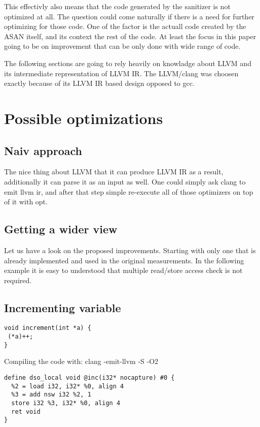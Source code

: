 \documentclass[letterpaper, 10 pt, conference]{llncs}  %
\let\cite\parencite
\begin{document}
This effectivly also means that the code generated by the sanitizer is not optimized at all. The question could come naturally if there is a need for further optimizing for those code. One of the factor is the actuall code created by the ASAN itself, and its context the rest of the code. At least the focus in this paper going to be on improvement that can be only done with wide range of code.

The following sections are going to rely heavily on knowladge about LLVM\cite{lattner2008llvm} and its intermediate representation of LLVM IR\cite{llvm-ir}. The LLVM/clang was choosen exactly because of its LLVM IR based design opposed to gcc.

\section{Possible optimizations}

\subsection{Naiv approach}

The nice thing about LLVM that it can produce LLVM IR as a result, additionally it can parse it as an input as well. One could simply ask clang to emit llvm ir, and after that step simple re-execute all of those optimizers on top of it with opt.



\subsection{Getting a wider view}


Let us have a look on the proposed\cite{serebryany2012addresssanitizer} improvements. Starting with only one that is already implemented and used in the original measurements. In the following example it is easy to understood that multiple read/store access check is not required.

\subsection{Incrementing variable}

\begin{verbatim}
void increment(int *a) {
 (*a)++;
}
\end{verbatim}

Compiling the code with: clang -emit-llvm -S -O2
\begin{verbatim}
define dso_local void @inc(i32* nocapture) #0 {
  %2 = load i32, i32* %0, align 4
  %3 = add nsw i32 %2, 1
  store i32 %3, i32* %0, align 4
  ret void
}
\end{verbatim}
\end{document}
